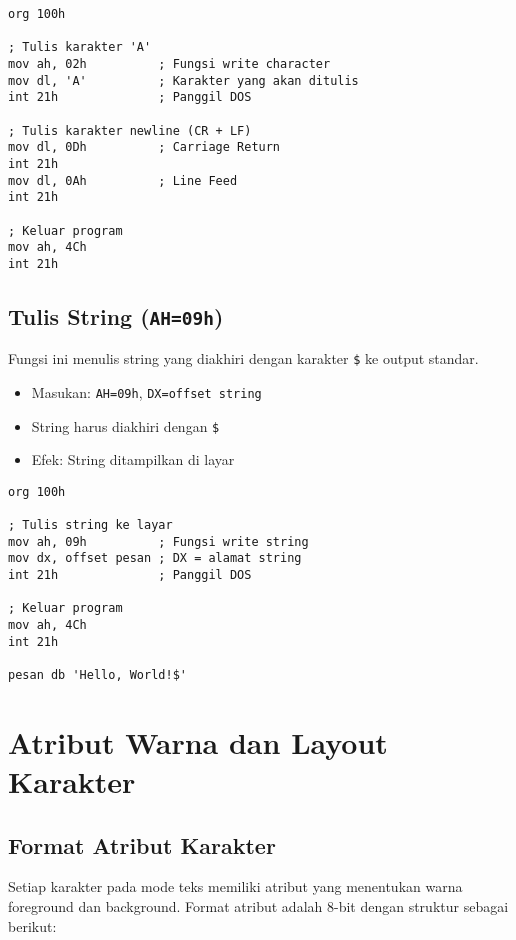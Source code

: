 \documentclass[../main.tex]{subfiles}
\begin{document}
            \begin{lstlisting}[language={[x86masm]Assembler}, caption=Contoh Tulis Karakter dengan INT 21h AH=02h, label={lst:dos-write-char}]
org 100h

; Tulis karakter 'A'
mov ah, 02h          ; Fungsi write character
mov dl, 'A'          ; Karakter yang akan ditulis
int 21h              ; Panggil DOS

; Tulis karakter newline (CR + LF)
mov dl, 0Dh          ; Carriage Return
int 21h
mov dl, 0Ah          ; Line Feed
int 21h

; Keluar program
mov ah, 4Ch
int 21h
            \end{lstlisting}

        \subsection{Tulis String (\texttt{AH=09h})}
            Fungsi ini menulis string yang diakhiri dengan karakter \texttt{\$} ke output standar.
            \begin{itemize}
\item Masukan: \texttt{AH=09h}, \texttt{DX=offset string}
\item String harus diakhiri dengan \texttt{\$}
\item Efek: String ditampilkan di layar
            \end{itemize}

            \begin{lstlisting}[language={[x86masm]Assembler}, caption=Contoh Tulis String dengan INT 21h AH=09h, label={lst:dos-write-string}]
org 100h

; Tulis string ke layar
mov ah, 09h          ; Fungsi write string
mov dx, offset pesan ; DX = alamat string
int 21h              ; Panggil DOS

; Keluar program
mov ah, 4Ch
int 21h

pesan db 'Hello, World!$'
            \end{lstlisting}

    \section{Atribut Warna dan Layout Karakter}
        \subsection{Format Atribut Karakter}
            Setiap karakter pada mode teks memiliki atribut yang menentukan warna foreground dan background. Format atribut adalah 8-bit dengan struktur sebagai berikut:
            
\end{document}
